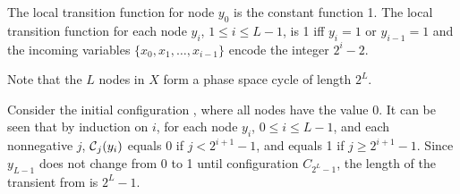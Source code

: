 The local transition function for node $y_0$ is the constant function 1.
The local transition function for each node $y_i$, $1 \leq i \leq L-1$,
is 1 iff $y_i = 1$ or $y_{i-1} = 1$ and the incoming variables $\{x_0, x_1, \dots , x_{i-1}\}$
encode the integer $2^i-2$.

Note that the $L$ nodes in $X$ form a phase space cycle of length $2^L$.

Consider the initial configuration \calc{}, where all nodes have the value 0.
It can be seen that by induction on $i$, for each node $y_i$, $0 \leq i \leq L-1$,
and each nonnegative $j$, 
$\mbox{$\mathcal{C}$}_j(y_i)$ equals 0 if $j < 2^{i+1} -1$, and equals 1 if $j \geq 2^{i+1} -1$.
Since $y_{L-1}$ does not change from 0 to 1 until configuration $C_{2^L-1}$, 
the length of the transient from \calc{} is $2^L-1$.
\QED
